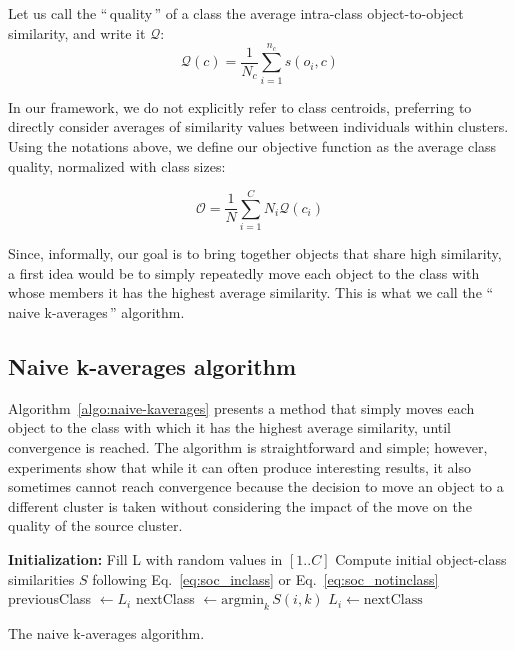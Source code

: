\documentclass[10pt,letterpaper]{article}
\newcommand{\gl}[1]{``\,#1\,''} %
\begin{document}
Let us call the \gl{quality} of a class the average intra-class object-to-object similarity, and write it $\mathcal{Q}$:
\begin{equation}
	\mathcal{Q}\left(c\right) = \frac{1}{N_c} \sum_{i=1}^{n_c} s\left(o_i, c\right)
    \label{eq:class_qual_base}
\end{equation}


In our framework, we do not explicitly refer to class centroids, preferring to directly consider averages of similarity values between individuals within clusters. Using the notations above, we define our objective function as the average class quality, normalized with class sizes:

\begin{equation}
  \mathcal{O} = \frac{1}{N} \sum_{i=1}^{C} N_i \mathcal{Q}(c_i)
  \label{eq:objective_function}
\end{equation}

Since, informally, our goal is to bring together objects that share high similarity, a first idea would be to simply repeatedly move each object to the class with whose members it has the highest average similarity. This is what we call the \gl{naive k-averages} algorithm.

\subsection{Naive k-averages algorithm}

Algorithm~\ref{algo:naive-kaverages} presents a method that simply moves each object to the class with which it has the highest average similarity, until convergence is reached. The algorithm is straightforward and simple; however, experiments show that while it can often produce interesting results, it also sometimes cannot reach convergence because the decision to move an object to a different cluster is taken without considering the impact of the move on the quality of the source cluster.

\begin{algorithm}
	\SetAlgoLined
	\BlankLine
	\textbf{Initialization:}
		Fill L with random values in $[1..C]$\;
		Compute initial object-class similarities $S$ following Eq.~\ref{eq:soc_inclass} or Eq.~\ref{eq:soc_notinclass}\;
	\BlankLine
	 {
		 {
			previousClass $\leftarrow L_i$\;
			nextClass $\leftarrow \mathrm{argmin}_k\, S(i, k)$
			 {
				$L_i \leftarrow \mathrm{nextClass}$\;
			}
		}
	}
	\BlankLine
	\caption{The naive k-averages algorithm.}
  \label{algo:naive-kaverages}
\end{algorithm}
\end{document}
